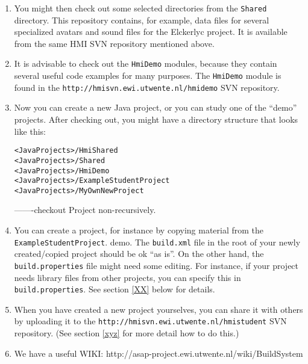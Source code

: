 \begin{enumerate}
\item You might then check out some selected directories from
the \verb"Shared" directory.
This repository contains, for example, data files for several specialized avatars and sound files for the Elckerlyc project.
It is available from  the same HMI SVN repository mentioned above.
\item It is advisable to check out the \verb"HmiDemo" modules, because they contain several useful code examples for many purposes. The \verb"HmiDemo" module is found in the \verb"http://hmisvn.ewi.utwente.nl/hmidemo" SVN repository.
\item Now you can create a new Java project, or you can study one of the ``demo'' projects.
After checking out, you might have a directory structure that looks like this:
\begin{verbatim}
<JavaProjects>/HmiShared
<JavaProjects>/Shared
<JavaProjects>/HmiDemo
<JavaProjects>/ExampleStudentProject
<JavaProjects>/MyOwnNewProject
\end{verbatim}


-------checkout Project non-recursively.


\item You can create a project, for instance by copying material from the  \verb"ExampleStudentProject".
 demo. The \verb"build.xml" file in the root of your newly created/copied project should be ok ``as is''.
 On the other hand, the \verb"build.properties" file might need some editing.
 For instance, if your project needs library files from other projects, you can specify this
 in \verb"build.properties".
 See section \ref{XX} below for details.

 \item When you have created a new project yourselves, you can share it with others by uploading it to
the \verb"http://hmisvn.ewi.utwente.nl/hmistudent" SVN repository. (See section \ref{xyz} for more detail how to do this.)

\item We have a useful WIKI: http://asap-project.ewi.utwente.nl/wiki/BuildSystem


\end{enumerate}

